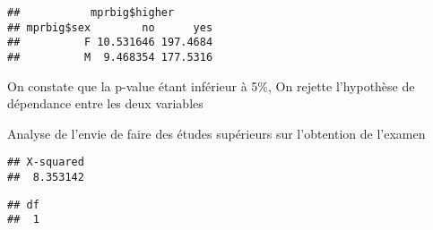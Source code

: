 \documentclass[
]{article}
\newenvironment{Shaded}{\begin{snugshade}}{\end{snugshade}}
\newcommand{\CommentTok}[1]{\textcolor[rgb]{0.56,0.35,0.01}{\textit{#1}}}
\newcommand{\KeywordTok}[1]{\textcolor[rgb]{0.13,0.29,0.53}{\textbf{#1}}}
\newcommand{\NormalTok}[1]{#1}
\newcommand{\OperatorTok}[1]{\textcolor[rgb]{0.81,0.36,0.00}{\textbf{#1}}}
\newcommand{\StringTok}[1]{\textcolor[rgb]{0.31,0.60,0.02}{#1}}
\begin{document}
\begin{Shaded}
\end{Shaded}

\begin{verbatim}
##           mprbig$higher
## mprbig$sex        no      yes
##          F 10.531646 197.4684
##          M  9.468354 177.5316
\end{verbatim}

On constate que la p-value étant inférieur à 5\%, On rejette l'hypothèse
de dépendance entre les deux variables

Analyse de l'envie de faire des études supérieurs sur l'obtention de
l'examen

\begin{Shaded}
\end{Shaded}

\begin{verbatim}
## X-squared 
##  8.353142
\end{verbatim}

\begin{Shaded}
\end{Shaded}

\begin{verbatim}
## df 
##  1
\end{verbatim}

\begin{Shaded}
\end{Shaded}
\end{document}
